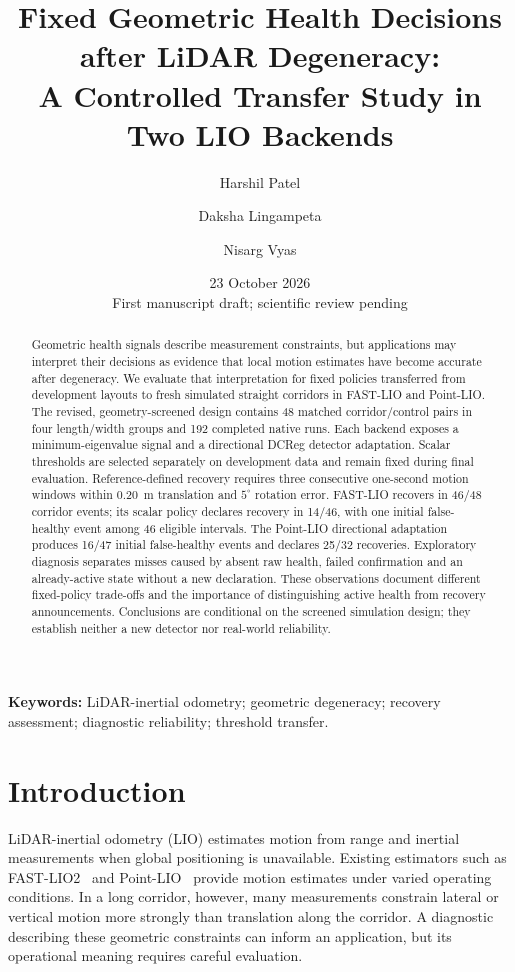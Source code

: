 \documentclass[11pt,a4paper]{article}
\title{Fixed Geometric Health Decisions after LiDAR Degeneracy:\\
A Controlled Transfer Study in Two LIO Backends}
\author{Harshil Patel \and Daksha Lingampeta \and Nisarg Vyas}
\date{23 October 2026\\\small First manuscript draft; scientific review pending}
\begin{document}
\maketitle
\begin{abstract}
Geometric health signals describe measurement constraints, but applications
may interpret their decisions as evidence that local motion estimates have
become accurate after degeneracy. We evaluate that interpretation for fixed
policies transferred from development layouts to fresh simulated straight
corridors in FAST-LIO and Point-LIO. The revised, geometry-screened design
contains 48 matched corridor/control pairs in four length/width groups and
192 completed native runs. Each backend exposes a minimum-eigenvalue signal
and a directional DCReg detector adaptation. Scalar thresholds are selected
separately on development data and remain fixed during final evaluation.
Reference-defined recovery requires three consecutive one-second motion
windows within 0.20~m translation and $5^\circ$ rotation error. FAST-LIO
recovers in 46/48 corridor events; its scalar policy declares recovery in
14/46, with one initial false-healthy event among 46 eligible intervals.
The Point-LIO directional adaptation produces 16/47 initial false-healthy
events and declares 25/32 recoveries. Exploratory diagnosis separates misses
caused by absent raw health, failed confirmation and an already-active state
without a new declaration. These observations document different fixed-policy
trade-offs and the importance of distinguishing active health from recovery
announcements. Conclusions are conditional on the screened simulation design;
they establish neither a new detector nor real-world reliability.
\end{abstract}
\noindent\textbf{Keywords:} LiDAR-inertial odometry; geometric degeneracy;
recovery assessment; diagnostic reliability; threshold transfer.

\section{Introduction}
LiDAR-inertial odometry (LIO) estimates motion from range and inertial
measurements when global positioning is unavailable. Existing estimators
such as FAST-LIO2~\cite{fastlio} and Point-LIO~\cite{pointlio} provide motion
estimates under varied operating conditions. In a long corridor, however,
many measurements constrain lateral or vertical motion more strongly than
translation along the corridor. A diagnostic describing these geometric
constraints can inform an application, but its operational meaning requires
careful evaluation.
\end{document}
